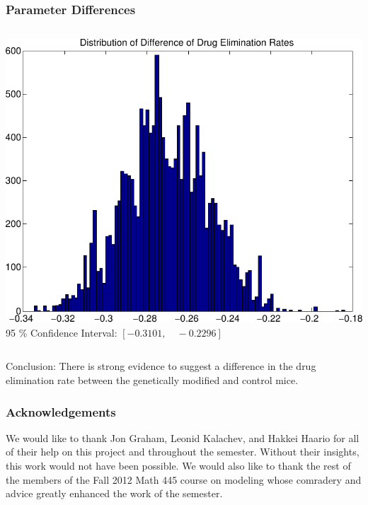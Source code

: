 \documentclass[t]{beamer}
\begin{document}
\begin{frame}
  \frametitle{Parameter Differences}
  \begin{columns}[T]
  \includegraphics[width=\textwidth]{elim_rate_diff.pdf}
    \vspace{2cm}
    95 \% Confidence Interval: $[-0.3101,\quad -0.2296]$
  \end{columns}
  \pause
  Conclusion:  There is strong evidence to suggest a difference in the \alert{drug elimination rate} between the genetically modified and control mice.
\end{frame}

\begin{frame}
  \frametitle{Acknowledgements}
  We would like to thank Jon Graham, Leonid Kalachev, and Hakkei Haario for all of their help on this project and throughout the semester.  Without their insights, this work would not have been possible. We would also like to thank the rest of the members of the Fall 2012 Math  445 course on modeling whose comradery and advice greatly enhanced the work of the semester.
\end{frame}
\end{document}
